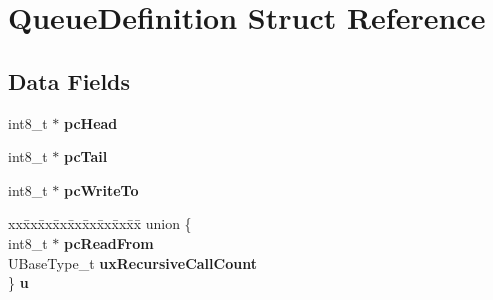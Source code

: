 \hypertarget{struct_queue_definition}{}\section{Queue\+Definition Struct Reference}
\label{struct_queue_definition}
\subsection*{Data Fields}
\begin{DoxyCompactItemize}
\item 
\mbox{\label{struct_queue_definition_adfa75f7bc22a3a58a907676c0164a1c1}} 
int8\+\_\+t $\ast$ {\bfseries pc\+Head}
\item 
\mbox{\label{struct_queue_definition_aec0a6e253e1e05c107bf2a77c1bed940}} 
int8\+\_\+t $\ast$ {\bfseries pc\+Tail}
\item 
\mbox{\label{struct_queue_definition_aa018576801d60d3a78ffacab53dc8b79}} 
int8\+\_\+t $\ast$ {\bfseries pc\+Write\+To}
\item 
\mbox{\label{struct_queue_definition_aa95e17aa5dd406b237b0531c1df4bb13}} 
\begin{tabbing}
xx\=xx\=xx\=xx\=xx\=xx\=xx\=xx\=xx\=\kill
union \{\\
\>int8\_t $\ast$ {\bfseries pcReadFrom}\\
\>UBaseType\_t {\bfseries uxRecursiveCallCount}\\
\} {\bfseries u}\\


\end{tabbing}
\end{DoxyCompactItemize}
